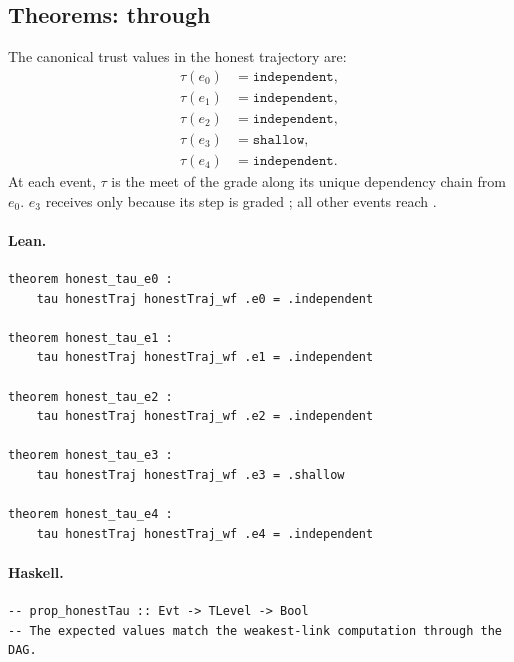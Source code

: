 \documentclass[11pt,a4paper]{article}
\begin{document}
\subsection{Theorems:  through }

\begin{thm}
The canonical trust values in the honest trajectory are:
\begin{align*}
  \tau(e_0) &= \mathtt{independent}, \\
  \tau(e_1) &= \mathtt{independent}, \\
  \tau(e_2) &= \mathtt{independent}, \\
  \tau(e_3) &= \mathtt{shallow}, \\
  \tau(e_4) &= \mathtt{independent}.
\end{align*}
At each event, $\tau$ is the meet of the grade along its unique dependency
chain from $e_0$.  $e_3$ receives only  because its step is
graded ; all other events reach .
\end{thm}

\paragraph{Lean.}
\begin{lstlisting}[style=lean]
theorem honest_tau_e0 :
    tau honestTraj honestTraj_wf .e0 = .independent

theorem honest_tau_e1 :
    tau honestTraj honestTraj_wf .e1 = .independent

theorem honest_tau_e2 :
    tau honestTraj honestTraj_wf .e2 = .independent

theorem honest_tau_e3 :
    tau honestTraj honestTraj_wf .e3 = .shallow

theorem honest_tau_e4 :
    tau honestTraj honestTraj_wf .e4 = .independent
\end{lstlisting}

\paragraph{Haskell.}
\begin{lstlisting}[style=haskell]
-- prop_honestTau :: Evt -> TLevel -> Bool
-- The expected values match the weakest-link computation through the DAG.
\end{lstlisting}

\end{document}
